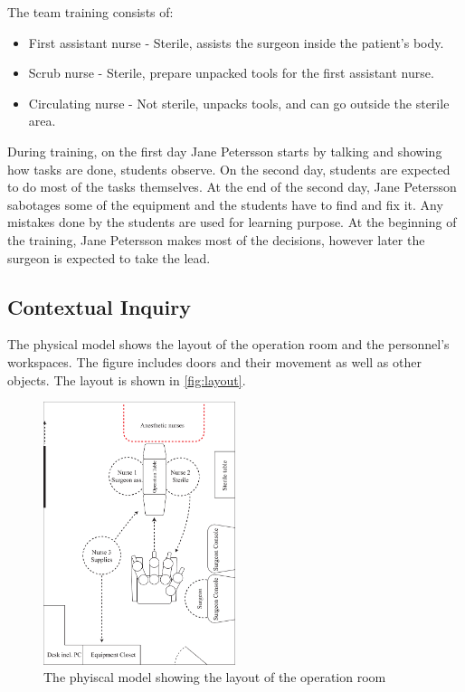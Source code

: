The team training consists of:
\begin{itemize}
  \item First assistant nurse - Sterile, assists the surgeon inside the patient's body.
  \item Scrub nurse - Sterile, prepare unpacked tools for the first assistant nurse.
  \item Circulating nurse - Not sterile, unpacks tools, and can go outside the sterile area.
\end{itemize}  

During training, on the first day Jane Petersson starts by talking and showing how tasks are done, students observe. On the second day, students are expected to do most of the tasks themselves. At the end of the second day, Jane Petersson sabotages some of the equipment and the students have to find and fix it. Any mistakes done by the students are used for learning purpose. At the beginning of the training, Jane Petersson makes most of the decisions, however later the surgeon is expected to take the lead.

\subsection{Contextual Inquiry}
The physical model shows the layout of the operation room and the personnel's workspaces. The figure includes doors and their movement as well as other objects. The layout is shown in \autoref{fig:layout}.

\begin{figure}[hpbt]
	\centering
	\includegraphics[width=0.5\textwidth]{FieldStudies/figures/physical}
	\caption{The phyiscal model showing the layout of the operation room}
	\label{fig:layout}
\end{figure}

